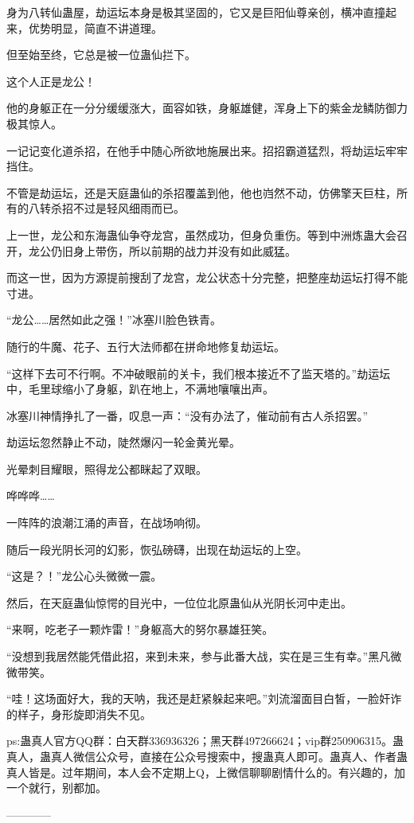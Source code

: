 \begin{this_body}
身为八转仙蛊屋，劫运坛本身是极其坚固的，它又是巨阳仙尊亲创，横冲直撞起来，优势明显，简直不讲道理。

但至始至终，它总是被一位蛊仙拦下。

这个人正是龙公！

他的身躯正在一分分缓缓涨大，面容如铁，身躯雄健，浑身上下的紫金龙鳞防御力极其惊人。

一记记变化道杀招，在他手中随心所欲地施展出来。招招霸道猛烈，将劫运坛牢牢挡住。

不管是劫运坛，还是天庭蛊仙的杀招覆盖到他，他也岿然不动，仿佛擎天巨柱，所有的八转杀招不过是轻风细雨而已。

上一世，龙公和东海蛊仙争夺龙宫，虽然成功，但身负重伤。等到中洲炼蛊大会召开，龙公仍旧身上带伤，所以前期的战力并没有如此威猛。

而这一世，因为方源提前搜刮了龙宫，龙公状态十分完整，把整座劫运坛打得不能寸进。

“龙公……居然如此之强！”冰塞川脸色铁青。

随行的牛魔、花子、五行大法师都在拼命地修复劫运坛。

“这样下去可不行啊。不冲破眼前的关卡，我们根本接近不了监天塔的。”劫运坛中，毛里球缩小了身躯，趴在地上，不满地嚷嚷出声。

冰塞川神情挣扎了一番，叹息一声：“没有办法了，催动前有古人杀招罢。”

劫运坛忽然静止不动，陡然爆闪一轮金黄光晕。

光晕刺目耀眼，照得龙公都眯起了双眼。

哗哗哗……

一阵阵的浪潮江涌的声音，在战场响彻。

随后一段光阴长河的幻影，恢弘磅礴，出现在劫运坛的上空。

“这是？！”龙公心头微微一震。

然后，在天庭蛊仙惊愕的目光中，一位位北原蛊仙从光阴长河中走出。

“来啊，吃老子一颗炸雷！”身躯高大的努尔暴雄狂笑。

“没想到我居然能凭借此招，来到未来，参与此番大战，实在是三生有幸。”黑凡微微带笑。

“哇！这场面好大，我的天呐，我还是赶紧躲起来吧。”刘流溜面目白皙，一脸奸诈的样子，身形旋即消失不见。

ps:蛊真人官方QQ群：白天群336936326；黑天群497266624；vip群250906315。蛊真人，蛊真人微信公众号，直接在公众号搜索中，搜蛊真人即可。蛊真人、作者蛊真人皆是。过年期间，本人会不定期上Q，上微信聊聊剧情什么的。有兴趣的，加一个就行，别都加。

------------

\end{this_body}

